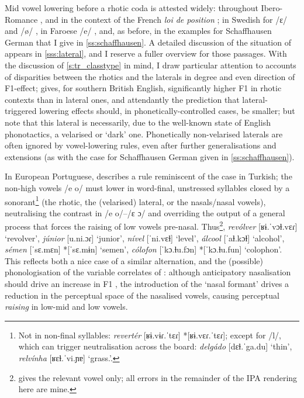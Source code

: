 
Mid vowel lowering before a rhotic coda is attested widely: throughout Ibero-Romance \citep{Bradley2010}, and in the context of the French \textit{loi de position} \citep{Storme2017}; in Swedish for /ɛ/ and /ø/ \citep{Riad2014}, in Faroese /e/ \citep{Arnason1999}, and, as before, in the examples for Schaffhausen German that I give in \cref{ss:schaffhausen}.
A detailed discussion of the situation of  appears in \cref{sss:lateral}, and I reserve a fuller overview for those passages. With the discussion of \cref{s:tr_classtype} in mind, I draw particular attention to accounts of disparities between the rhotics and the laterals in degree and even direction of F1-effect; \cite{West1999} gives, for southern British English, significantly higher F1 in rhotic contexts than in lateral ones, and attendantly the prediction that lateral-triggered lowering effects should, in phonetically-controlled cases, be smaller; but note that this lateral is necessarily, due to the well-known state of English phonotactics, a velarised or `dark' one. Phonetically non-velarised laterals are often ignored by vowel-lowering rules, even after further generalisations and extensions (as with the case for Schaffhausen German given in \cref{ss:schaffhausen}).

In European Portuguese, \citet[p.~86--88]{Vigario2002} describes a rule reminiscent of the case in Turkish; the non-high vowels /e o/ must lower in word-final, unstressed syllables closed by a sonorant\footnote{Not in non-final syllables: \textit{revertér} [ʁɨ.vɨɾ.ˈtɛɾ] *[ʁɨ.vɛɾ.ˈtɛɾ]; except for /l/, which can trigger neutralisation across the board: \textit{delgádo} [dɛɫ.ˈga.du] `thin', \textit{relvínha} [ʁɛɫ.ˈvi.ɲɐ] `grass.'.} (the rhotic, the (velarised) lateral, or the nasals/nasal vowels), neutralising the contrast in /e o/–/ɛ ɔ/ and overriding the output of a general process that forces the raising of low vowels pre-nasal. Thus\footnote{\citet{Vigario2002} gives the relevant vowel only; all errors in the remainder of the IPA rendering here are mine.}, \textit{revólver} [ʁɨ.ˈvɔɫ.vɛɾ] `revolver', \textit{júnior} [u.ni.ɔɾ] `junior', \textit{nível} [ˈni.vɛɫ] `level', \textit{álcool} [ˈaɫ.kɔɫ] `alcohol', \textit{sémen} [ˈsɛ.mɛn] *[ˈsɛ.mɨn] `semen', \textit{cólofon} [ˈkɔ.ɫu.fɔn] *[ˈkɔ.ɫu.fun] `colophon'. This reflects both a nice case of a similar alternation, and the (possible) phonologisation of the variable correlates of :  although anticipatory nasalisation should drive an increase in F1 \citep{Krakow1988}, the introduction of the `nasal formant' \citep{Beddor1993,Beddor1986} drives a reduction in the perceptual space of the nasalised vowels, causing perceptual \textit{raising} in low-mid and low vowels.

